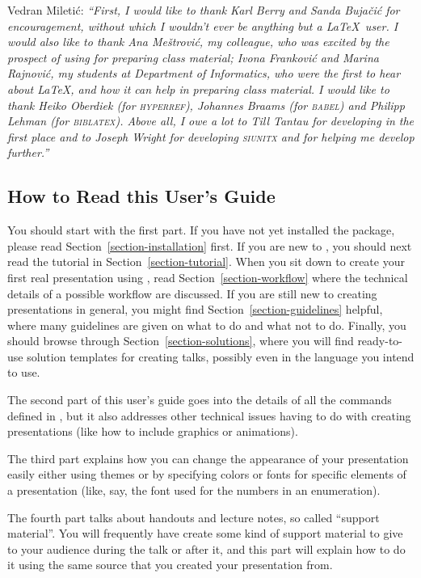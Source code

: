 Vedran Mileti\'c: \emph{``First, I would like to thank Karl Berry and Sanda Buja\v ci\'c for encouragement, without which I wouldn't ever be anything but a \LaTeX\ user. I would also like to thank Ana Me\v strovi\'c, my colleague, who was excited by the prospect of using \textsl{\beamer} for preparing class material; Ivona Frankovi\'c and Marina Rajnovi\'c, my students at Department of Informatics, who were the first to hear about \LaTeX, \textsl{\beamer} and how it can help in preparing class material. I would like to thank Heiko Oberdiek (for \textsl{\textsc{hyperref}}), Johannes Braams (for \textsl{\textsc{babel}}) and Philipp Lehman (for \textsl{\textsc{biblatex}}). Above all, I owe a lot to Till Tantau for developing \textsl{\beamer} in the first place and to Joseph Wright for developing \textsl{\textsc{siunitx}} and for helping me develop \textsl{\beamer} further.''}


\subsection{How to Read this User's Guide}

You should start with the first part. If you have not yet installed the package, please read Section~\ref{section-installation} first. If you are new to \beamer, you should next read the tutorial in Section~\ref{section-tutorial}. When you sit down to create your first real presentation using \beamer, read Section~\ref{section-workflow} where the technical details of a possible workflow are discussed. If you are still new to creating presentations in general, you might find Section~\ref{section-guidelines} helpful, where many guidelines are given on what to do and what not to do. Finally, you should browse through Section~\ref{section-solutions}, where you will find ready-to-use solution templates for creating talks, possibly even in the language you intend to use.

The second part of this user's guide goes into the details of all the commands defined in \beamer, but it also addresses  other technical issues having to do with creating presentations (like how to include graphics or animations).

The third part explains how you can change the appearance of your presentation easily either using themes or by specifying colors or fonts for specific elements of a presentation (like, say, the font used for the numbers in an enumeration).

The fourth part talks about handouts and lecture notes, so called ``support material''. You will frequently have create some kind of support material to give to your audience during the talk or after it, and this part will explain how to do it using the same source that you created your presentation from.

